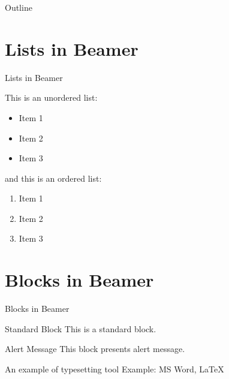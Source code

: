 \documentclass[aspectratio=169]{beamer}
\begin{document}
\begin{frame}{Outline}
    \tableofcontents

\end{frame}


\section{Lists in Beamer}
\begin{frame}{Lists in Beamer}

This is an unordered list:
\begin{itemize}
    \item Item 1
    \item Item 2
    \item Item 3
\end{itemize}

and this is an ordered list:
\begin{enumerate}
    \item Item 1
    \item Item 2
    \item Item 3
\end{enumerate}

\end{frame}


\section{Blocks in Beamer}
\begin{frame}{Blocks in Beamer}
    \begin{block}{Standard Block}
        This is a standard block.
    \end{block}
    \begin{alertblock}{Alert Message}
        This block presents alert message.
    \end{alertblock}
    \begin{exampleblock}{An example of typesetting tool}
        Example: MS Word, \LaTeX{}
    \end{exampleblock}
\end{frame} 
\end{document}
